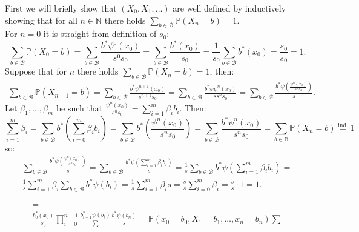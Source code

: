 \documentclass[a4paper]{article}
\newcommand{\ndotsm}[3]{{#1}_{#2}, \dots, {#1}_{#3}}
\begin{document}
First we will briefly show that $(X_0, X_1, \dots)$ are well defined by inductively showing that for all
$n \in \mathbb{N}$ there holds $\displaystyle\sum_{b \in \mathcal{B}}\mathbb{P}(X_n = b) = 1$. \\
For $n = 0$ it is straight from definition of $s_0$:
\begin{equation*}
    \sum_{b \in \mathcal{B}}\mathbb{P}(X_0 = b) = \sum_{b \in \mathcal{B}}\frac{b^*\psi^0(x_0)}{s^0s_0} =
    \sum_{b \in \mathcal{B}}\frac{b^*(x_0)}{s_0} = \frac{1}{s_0}\sum_{b \in \mathcal{B}}b^*(x_0) =
    \frac{s_0}{s_0}=1.
\end{equation*}
Suppose that for $n$ there holds $\displaystyle\sum_{b \in \mathcal{B}}\mathbb{P}(X_n = b) = 1$, then:
\begin{gather*}
    \sum_{b\in\mathcal{B}}\mathbb{P}(X_{n+1} = b) =
    \sum_{b\in\mathcal{B}}\frac{b^*\psi^{n+1}(x_0)}{s^{n+1}s_0} =
    \sum_{b\in\mathcal{B}}\frac{b^*\psi\psi^n(x_0)}{ss^ns_0} =
    \sum_{b \in\mathcal{B}}\frac{b^*\psi\left(\frac{\psi^n(x_0)}{s^{n}s_0}\right)}{s}.
\end{gather*}
Let $\ndotsm{\beta}{1}{m}$ be such that $\frac{\psi^n(x_0)}{s^ns_0} = \displaystyle\sum_{i = 1}^m\beta_ib_i$.
Then:
\begin{equation*}
    \sum_{i = 1}^m \beta_i = \sum_{b \in \mathcal{B}} b^*\left(\sum_{i=0}^m\beta_ib_i\right)=
    \sum_{b \in \mathcal{B}} b^*\left(\frac{\psi^n(x_0)}{s^ns_0}\right) = \sum_{b \in \mathcal{B}}
    \frac{b^*\psi^n(x_0)}{s^ns_0} = \sum_{b \in \mathbb{B}}\mathbb{P}(X_n = b) \overset{\mathrm{ind.}}{=}1
\end{equation*}
so:
\begin{gather*}
    \sum_{b \in\mathcal{B}}\frac{b^*\psi\left(\frac{\psi^n(x_0)}{s^{n}s_0}\right)}{s} =
    \sum_{b \in\mathcal{B}}\frac{b^*\psi\left(\displaystyle\sum_{i = 1}^m\beta_ib_i\right)}{s} =
    \frac{1}{s}\sum_{b \in \mathcal{B}}b^*\psi\left(\sum_{i=1}^m\beta_ib_i\right) = \\
    \frac{1}{s}\sum_{i=1}^m\beta_i\sum_{b \in \mathcal{B}}b^*\psi(b_i) =
    \frac{1}{s}\sum_{i=1}^m\beta_is = \frac{s}{s}\sum_{i = 0}^m\beta_i = \frac{s}{s}\cdot1=1.
\end{gather*}

\begin{gather*}
    = \\
    \frac{b_0^*(x_0)}{s_0}\prod_{i=0}^{n-1}\frac{b_{i+1}^*\psi(b_i)}\sum\frac{b^*\psi(b_n)}{s} =
    \mathbb{P}(x_0 = b_0, X_1 = b_1, \dots, x_n = b_n)\sum_{}
\end{gather*}
\end{document}
